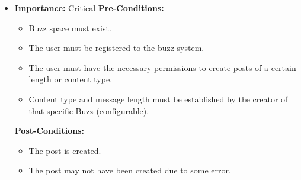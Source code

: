 \documentclass[11pt]{article}
\begin{document}
\begin{enumerate}
\begin{itemize}
\item \textbf{Importance:} Critical\newline
\textbf{Pre-Conditions: }
	\begin{itemize}
	\item Buzz space must exist.
	\item The user must be registered to the buzz system.
	\item The user must have the necessary permissions to create posts of a certain length or content type.
	\item Content type and message length must be established by the creator of that specific Buzz (configurable).
	\end{itemize}

\textbf{Post-Conditions: }
	\begin{itemize}
	\item The post is created.
	\item The post may not have been created due to some error.
	\end{itemize}
\end{itemize}


\end{enumerate}
\end{document}
